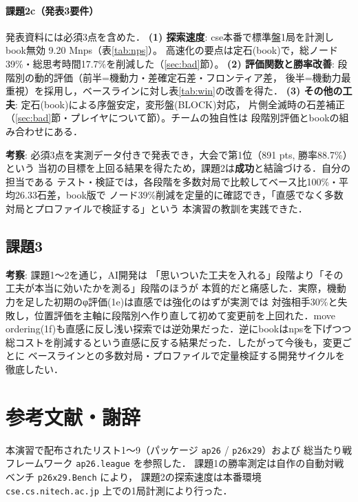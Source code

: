 \documentclass[11pt,a4j]{ujarticle} %
\begin{document}
\paragraph{課題2c（発表3要件）}
発表資料には必須3点を含めた．
\textbf{(1) 探索速度}: cse本番で標準盤1局を計測し book無効 9.20 Mnps（表\ref{tab:nps}）。
高速化の要点は定石(book)で，総ノード39\%・総思考時間17.7\%を削減した（\ref{sec:bad}節）。
\textbf{(2) 評価関数と勝率改善}: 段階別の動的評価（前半=機動力・差確定石差・フロンティア差，
後半=機動力最重視）を採用し，ベースラインに対し表\ref{tab:win}の改善を得た．
\textbf{(3) その他の工夫}: 定石(book)による序盤安定，変形盤(BLOCK)対応，
片側全滅時の石差補正（\ref{sec:bad}節・プレイヤについて節）。チームの独自性は
段階別評価とbookの組み合わせにある．

\textbf{考察}: 必須3点を実測データ付きで発表でき，大会で第1位（891 pts, 勝率88.7\%）という
当初の目標を上回る結果を得たため，課題2は\textbf{成功}と結論づける．自分の担当である
テスト・検証では，各段階を多数対局で比較してベース比100\%・平均26.33石差，book版で
ノード39\%削減を定量的に確認でき，「直感でなく多数対局とプロファイルで検証する」という
本演習の教訓を実践できた．

\subsection{課題3}
\textbf{考察}: 課題1〜2を通じ，AI開発は
「思いついた工夫を入れる」段階より「その工夫が本当に効いたかを測る」段階のほうが
本質的だと痛感した．実際，機動力を足した初期のφ評価(1e)は直感では強化のはずが実測では
対強相手30\%と失敗し，位置評価を主軸に段階別へ作り直して初めて変更前を上回れた．move
ordering(1f)も直感に反し浅い探索では逆効果だった．逆にbookはnpsを下げつつ総コストを削減するという直感に反する結果だった．したがって今後も，変更ごとに
ベースラインとの多数対局・プロファイルで定量検証する開発サイクルを徹底したい．

\section{参考文献・謝辞}
本演習で配布されたリスト1〜9（パッケージ {\verb+ap26+} / {\verb+p26x29+}）および
総当たり戦フレームワーク {\verb+ap26.league+} を参照した．
課題1の勝率測定は自作の自動対戦ベンチ {\verb+p26x29.Bench+} により，
課題2の探索速度は本番環境 {\tt cse.cs.nitech.ac.jp} 上での1局計測により行った．
\end{document}
